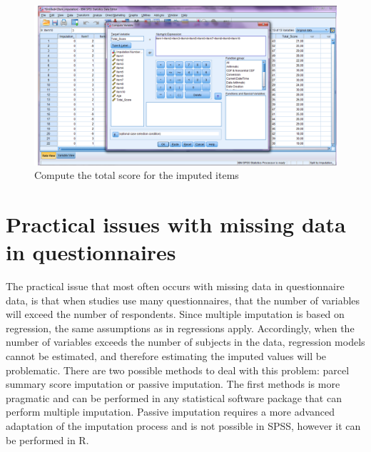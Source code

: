 \documentclass[
]{book}
\begin{document}
\begin{figure}

{\centering \includegraphics[width=0.9\linewidth]{images/fig8.6} 

}

\caption{Compute the total score for the imputed items}\label{fig:fig8-6}
\end{figure}

\hypertarget{practical-issues-with-missing-data-in-questionnaires}{%
\section{Practical issues with missing data in questionnaires}\label{practical-issues-with-missing-data-in-questionnaires}}

The practical issue that most often occurs with missing data in questionnaire data, is that when studies use many questionnaires, that the number of variables will exceed the number of respondents. Since multiple imputation is based on regression, the same assumptions as in regressions apply. Accordingly, when the number of variables exceeds the number of subjects in the data, regression models cannot be estimated, and therefore estimating the imputed values will be problematic.
There are two possible methods to deal with this problem: parcel summary score imputation or passive imputation. The first methods is more pragmatic and can be performed in any statistical software package that can perform multiple imputation. Passive imputation requires a more advanced adaptation of the imputation process and is not possible in SPSS, however it can be performed in R.
\end{document}
